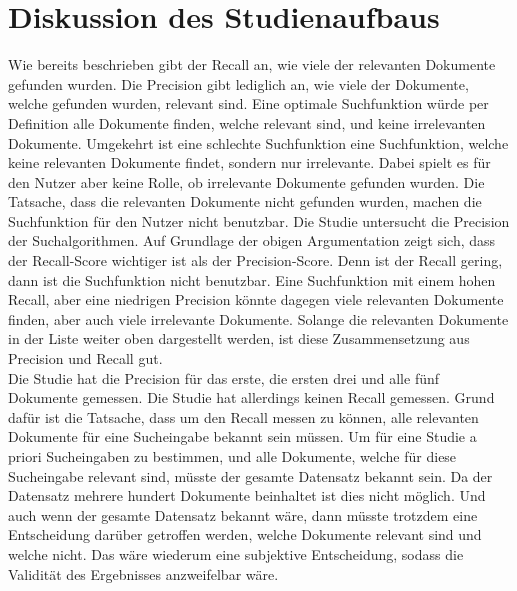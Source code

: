 \section{Diskussion des Studienaufbaus}
Wie bereits beschrieben gibt der Recall an, wie viele der relevanten Dokumente gefunden wurden.
Die Precision gibt lediglich an, wie viele der Dokumente, welche gefunden wurden, relevant sind.
Eine optimale Suchfunktion würde per Definition alle Dokumente finden, welche relevant sind, und keine irrelevanten Dokumente.
Umgekehrt ist eine schlechte Suchfunktion eine Suchfunktion, welche keine relevanten Dokumente findet, sondern nur irrelevante.
Dabei spielt es für den Nutzer aber keine Rolle, ob irrelevante Dokumente gefunden wurden.
Die Tatsache, dass die relevanten Dokumente nicht gefunden wurden, machen die Suchfunktion für den Nutzer nicht benutzbar. 
Die Studie untersucht die Precision der Suchalgorithmen.
Auf Grundlage der obigen Argumentation zeigt sich, dass der Recall-Score wichtiger ist als der Precision-Score.
Denn ist der Recall gering, dann ist die Suchfunktion nicht benutzbar.
Eine Suchfunktion mit einem hohen Recall, aber eine niedrigen Precision könnte dagegen viele relevanten Dokumente finden, aber auch viele irrelevante Dokumente.
Solange die relevanten Dokumente in der Liste weiter oben dargestellt werden, ist diese Zusammensetzung aus Precision und Recall gut.\\

Die Studie hat die Precision für das erste, die ersten drei und alle fünf Dokumente gemessen.
Die Studie hat allerdings keinen Recall gemessen.
Grund dafür ist die Tatsache, dass um den Recall messen zu können, alle relevanten Dokumente für eine Sucheingabe bekannt sein müssen.
Um für eine Studie a priori Sucheingaben zu bestimmen, und alle Dokumente, welche für diese Sucheingabe relevant sind, müsste der gesamte Datensatz bekannt sein.
Da der Datensatz mehrere hundert Dokumente beinhaltet ist dies nicht möglich.
Und auch wenn der gesamte Datensatz bekannt wäre, dann müsste trotzdem eine Entscheidung darüber getroffen werden, welche Dokumente relevant sind und welche nicht.
Das wäre wiederum eine subjektive Entscheidung, sodass die Validität des Ergebnisses anzweifelbar wäre.

